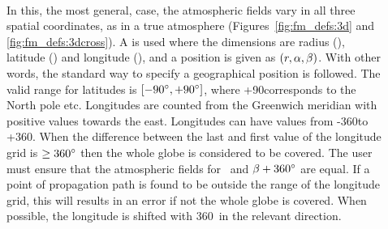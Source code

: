 \begin{description}
\item[\,\,\,] In this, the most general, case, the atmospheric
  fields vary in all three spatial coordinates, as in a true atmosphere
  (Figures~\ref{fig:fm_defs:3d} and \ref{fig:fm_defs:3dcross}). A
   is used where the dimensions are
  radius (\Rds), latitude (\Lat) and longitude (\Lon), and a position is given
  as $(r,\alpha,\beta)$. With other words, the standard way to specify a
  geographical position is followed. The valid range for latitudes is
  $[-90^\circ,+90^\circ]$, where +90\degree corresponds to the North pole
  etc. Longitudes are counted from the Greenwich meridian with positive values
  towards the east. Longitudes can have values from -360\degree to +360\degree.
  When the difference between the last and first value of the longitude grid is
  $\geq 360^\circ$ then the whole globe is considered to be covered. The user
  must ensure that the atmospheric fields for \Lon\ and $\beta+360^\circ$ are
  equal. If a point of propagation path is found to be outside the range of the
  longitude grid, this will results in an error if not the whole globe is
  covered. When possible, the longitude is shifted with 360\degree\ in the
  relevant direction.
  

\end{description}

